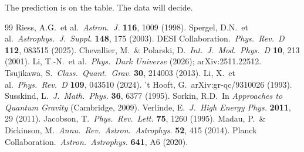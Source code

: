 \documentclass[12pt,a4paper]{article}
\begin{document}
The prediction is on the table. The data will decide.

\begin{thebibliography}{99}
 Riess, A.G.\ et al.\ {\it Astron.\ J.} {\bf 116}, 1009 (1998).
 Spergel, D.N.\ et al.\ {\it Astrophys.\ J.\ Suppl.} {\bf 148}, 175 (2003).
 DESI Collaboration.\ {\it Phys.\ Rev.\ D} {\bf 112}, 083515 (2025).
 Chevallier, M.\ \& Polarski, D.\ {\it Int.\ J.\ Mod.\ Phys.\ D} {\bf 10}, 213 (2001).
 Li, T.-N.\ et al.\ {\it Phys.\ Dark Universe} (2026); arXiv:2511.22512.
 Tsujikawa, S.\ {\it Class.\ Quant.\ Grav.} {\bf 30}, 214003 (2013).
 Li, X.\ et al.\ {\it Phys.\ Rev.\ D} {\bf 109}, 043510 (2024).
 't Hooft, G.\ arXiv:gr-qc/9310026 (1993).
 Susskind, L.\ {\it J.\ Math.\ Phys.} {\bf 36}, 6377 (1995).
 Sorkin, R.D.\ In {\it Approaches to Quantum Gravity} (Cambridge, 2009).
 Verlinde, E.\ {\it J.\ High Energy Phys.} {\bf 2011}, 29 (2011).
 Jacobson, T.\ {\it Phys.\ Rev.\ Lett.} {\bf 75}, 1260 (1995).
 Madau, P.\ \& Dickinson, M.\ {\it Annu.\ Rev.\ Astron.\ Astrophys.} {\bf 52}, 415 (2014).
 Planck Collaboration.\ {\it Astron.\ Astrophys.} {\bf 641}, A6 (2020).
\end{thebibliography}
\end{document}

